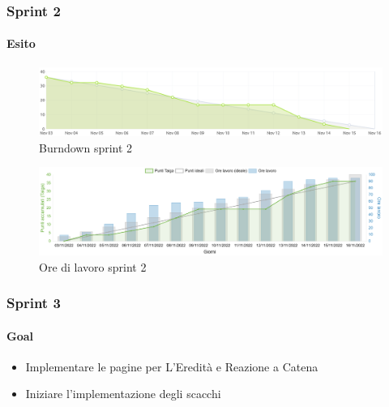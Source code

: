 \documentclass{beamer}
\begin{document}

\begin{frame}
  \frametitle{Sprint 2}
  \framesubtitle{Esito}

  \begin{figure}
    \centering
    \includegraphics[width=\textwidth]{../img/sprint2/burndown.png}    
    \caption{Burndown sprint 2}
  \end{figure}
  \begin{figure}
    \centering
    \includegraphics[width=\textwidth]{../img/sprint2/worktime.png}    
    \caption{Ore di lavoro sprint 2}
  \end{figure}
\end{frame}


\begin{frame}
  \frametitle{Sprint 3}
  \framesubtitle{Goal}

  \begin{itemize}
    \item Implementare le pagine per L'Eredità e Reazione a Catena
    \item Iniziare l'implementazione degli scacchi
  \end{itemize}
\end{frame}
\end{document}
